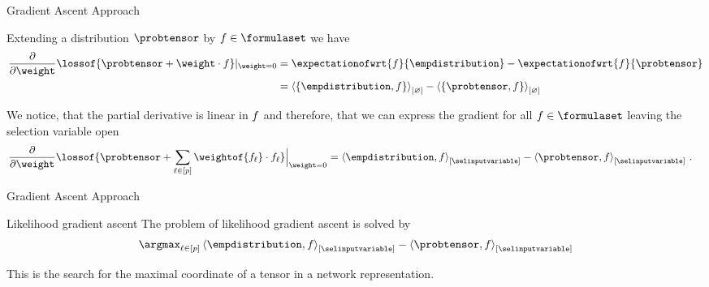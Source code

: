 \documentclass{beamer}
\begin{document}
\begin{frame}{Gradient Ascent Approach}


Extending a distribution $\probtensor$ by $\exformulain$ we have
\begin{align*}
	\frac{\partial}{\partial \weight} \lossof{\probtensor+\weight\cdot\exformula} |_{\weight=0}
	& = \expectationofwrt{\exformula}{\empdistribution} - \expectationofwrt{\exformula}{\probtensor} \\
	& = \contractionof{\{\empdistribution, \exformula\}}{\varnothing}
	 - \contractionof{\{\probtensor, \exformula\}}{\varnothing}
\end{align*}

We notice, that the partial derivative is linear in $f$ and therefore, that we can express the gradient for all $\exformulain$ leaving the selection variable open
\begin{align*}
	\frac{\partial}{\partial \weight} \lossof{\probtensor+\sum_{\selindexin}\weightof{\exformula_{\selindex}}\cdot\exformula_{\selindex}} \Big|_{\weight=0}
	& = \contractionof{\empdistribution, \exformula}{\selinputvariable} - \contractionof{\probtensor, \exformula}{\selinputvariable} \, .
\end{align*}

\end{frame}



\begin{frame}{Gradient Ascent Approach}

\begin{block}{Likelihood gradient ascent}
	The problem of likelihood gradient ascent is solved by
	\begin{align*}
		\argmax_{\selindexin} \contractionof{\empdistribution, \exformula}{\selinputvariable} - \contractionof{\probtensor, \exformula}{\selinputvariable}
	\end{align*}
\end{block}

This is the search for the maximal coordinate of a tensor in a network representation.

\end{frame}
\end{document}
